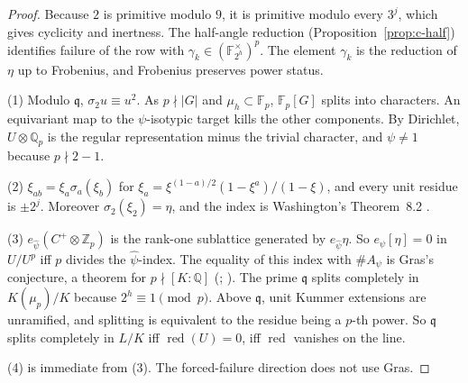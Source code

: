 \begin{proof}
Because $2$ is primitive modulo $9$, it is primitive modulo every $3^j$,
which gives cyclicity and inertness.  The half-angle reduction
(Proposition~\ref{prop:c-half}) identifies failure of the row with
$\gamma_k\in(\mathbb F_{2^h}^{\times})^p$.  The element $\gamma_k$ is the
reduction of $\eta$ up to Frobenius, and Frobenius preserves power status.

(1) Modulo $\mathfrak q$, $\sigma_2u\equiv u^2$.  As $p\nmid|G|$ and
$\mu_h\subset\mathbb F_p$, $\mathbb F_p[G]$ splits into characters.  An
equivariant map to the $\psi$-isotypic target kills the other components.
By Dirichlet, $U\otimes\mathbb Q_p$ is the regular representation minus the
trivial character, and $\psi\neq1$ because $p\nmid2-1$.

(2) $\xi_{ab}=\xi_a\sigma_a(\xi_b)$ for
$\xi_a=\xi^{(1-a)/2}(1-\xi^a)/(1-\xi)$, and every unit residue is $\pm2^j$.
Moreover $\sigma_2(\xi_2)=\eta$, and the index is Washington's Theorem~8.2
\cite{washington1997}.

(3) $e_{\hat\psi}(C^+\otimes\mathbb Z_p)$ is the rank-one sublattice generated
by $e_{\hat\psi}\eta$.  So $e_\psi[\eta]=0$ in $U/U^p$ iff $p$ divides the
$\hat\psi$-index.  The equality of this index with $\#A_\psi$ is Gras's
conjecture, a theorem for $p\nmid[K:\mathbb Q]$
(\cite{mazurwiles1984}; \cite[Cor.~4.15]{greither1992}).  The prime
$\mathfrak q$ splits completely in $K(\mu_p)/K$ because $2^h\equiv1\pmod p$.
Above $\mathfrak q$, unit Kummer extensions are unramified, and splitting is
equivalent to the residue being a $p$-th power.  So $\mathfrak q$ splits
completely in $L/K$ iff $\operatorname{red}(U)=0$, iff $\operatorname{red}$
vanishes on the line.

(4) is immediate from (3).  The forced-failure direction does not use Gras.
\end{proof}

